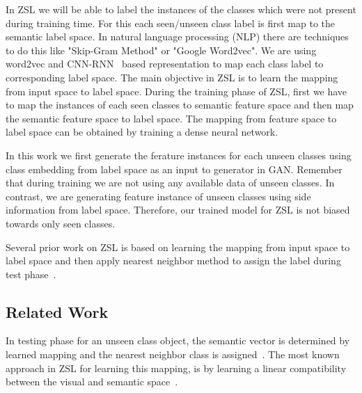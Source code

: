 \documentclass[11pt, conference, english]{IEEEtran}
\theoremstyle{plain}
\theoremstyle{definition}
\theoremstyle{remark}
\begin{document}
	
	In ZSL we will be able to label the instances of the classes which were not present during training time. For this each seen/unseen class label is first map to the semantic label space. In natural language processing (NLP) there are techniques to do this like "Skip-Gram Method" or "Google Word2vec". We are using word2vec and CNN-RNN~\cite{scott2016CVPR} based representation to  map each class label to corresponding label space. The main objective in ZSL is to learn the mapping from input space to label space. During the training phase of ZSL, first we have to map the instances of each seen classes to semantic feature space and then map the semantic feature space to label space. The mapping from feature space to label space can be obtained by training a dense neural network.
	
	In this work we first generate the ferature instances for each unseen classes using class embedding from label space as an input to generator in GAN. Remember that during training we are not using any available  data of unseen classes. In contrast, we are generating feature instance of unseen classes using side information from label space. Therefore, our trained model for ZSL is not biased towards only seen classes.
	
	Several prior work on ZSL is based on learning the mapping from input space to label space and then apply nearest neighbor method to assign the label during test phase~\cite{frome2013devise,lake2011one}. 
	\subsection{Related Work}
In testing phase for an unseen class
object,  the semantic vector is determined by learned mapping and the nearest
neighbor class is assigned~\cite{wang2016relational,socher2013zero}. The most known
approach in ZSL for learning this mapping, is by learning a linear compatibility between the visual and semantic space~\cite{frome2013devise}.
\end{document}
